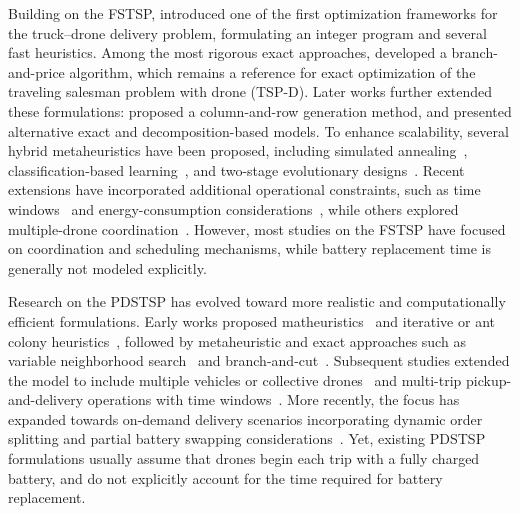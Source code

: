 \documentclass[3p, authoryear, 11pt]{elsarticle}
\begin{document}
Building on the FSTSP, \citet{agatz_optimization_2018} introduced one of the first optimization frameworks for the truck–drone delivery problem, formulating an integer program and several fast heuristics.
Among the most rigorous exact approaches, \citet{roberti_exact_2021} developed a branch-and-price algorithm, which remains a reference for exact optimization of the traveling salesman problem with drone (TSP-D). Later works further extended these formulations: \citet{boccia_columnandrow_2021} proposed a column-and-row generation method, and \citet{dellamico_exact_2022} presented alternative exact and decomposition-based models. 
To enhance scalability, several hybrid metaheuristics have been proposed, including simulated annealing~\citep{yu_solving_2023}, classification-based learning~\citep{amitrano_classificationbased_2025}, and two-stage evolutionary designs~\citep{chen_twostage_2025}. 
Recent extensions have incorporated additional operational constraints, such as time windows~\citep{budak_hybrid_2023} and energy-consumption considerations~\citep{jeong_truckdrone_2019,aksit_flying_2024,esyurek_impact_2024}, while others explored multiple-drone coordination~\citep{rave_twoindexed_2025,schaumann_flying_2025}. 
However, most studies on the FSTSP have focused on coordination and scheduling mechanisms, while battery replacement time is generally not modeled explicitly.

Research on the PDSTSP has evolved toward more realistic and computationally efficient formulations. 
Early works proposed matheuristics~\citep{dellamico_matheuristic_2020} and iterative or ant colony heuristics~\citep{mbiadousaleu_iterative_2018,dinh_ants_2021}, followed by metaheuristic and exact approaches such as variable neighborhood search~\citep{lei_improved_2022} and branch-and-cut~\citep{nguyen_efficient_2023}. 
Subsequent studies extended the model to include multiple vehicles or collective drones~\citep{saleu_parallel_2022,nguyen_parallel_2023,montemanni_parallel_2024} and multi-trip pickup-and-delivery operations with time windows~\citep{meng_multivisit_2025}. More recently, the focus has expanded towards on-demand delivery scenarios incorporating dynamic order splitting and partial battery swapping considerations~\citep{li_drone_2025, li_multiobjective_2026}. 
Yet, existing PDSTSP formulations usually assume that drones begin each trip with a fully charged battery, and do not explicitly account for the time required for battery replacement.
\end{document}
